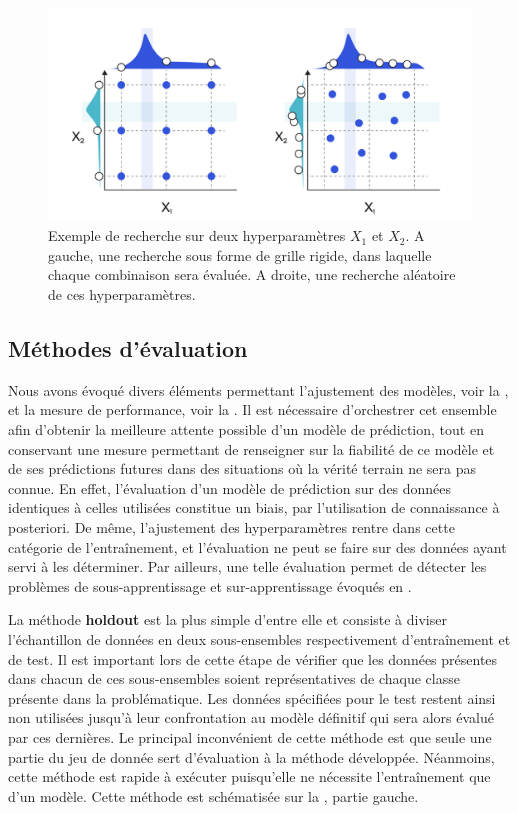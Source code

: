\begin{figure}[H]
    \centering
    \includegraphics[width=\linewidth]{contents/chapter_3/resources/example_hyperparameter_selection.pdf}
    \caption{Exemple de recherche sur deux hyperparamètres $X_1$ et $X_2$. A gauche, une recherche sous forme de grille rigide, dans laquelle chaque combinaison sera évaluée. A droite, une recherche aléatoire de ces hyperparamètres.}
    \label{fig:example_hyperparameter_selection}
\end{figure}

\subsection{Méthodes d'évaluation}
Nous avons évoqué divers éléments permettant l'ajustement des modèles, voir la , et la mesure de performance, voir la . Il est nécessaire d'orchestrer cet ensemble afin d'obtenir la meilleure attente possible d'un modèle de prédiction, tout en conservant une mesure permettant de renseigner sur la fiabilité de ce modèle et de ses prédictions futures dans des situations où la vérité terrain ne sera pas connue. En effet, l'évaluation d'un modèle de prédiction sur des données identiques à celles utilisées constitue un biais, par l'utilisation de connaissance à posteriori. De même, l'ajustement des hyperparamètres rentre dans cette catégorie de l'entraînement, et l'évaluation ne peut se faire sur des données ayant servi à les déterminer. Par ailleurs, une telle évaluation permet de détecter les problèmes de sous-apprentissage et sur-apprentissage évoqués en .\par

La méthode \textbf{holdout} est la plus simple d'entre elle et consiste à diviser l’échantillon de données en deux sous-ensembles respectivement d'entraînement et de test. Il est important lors de cette étape de vérifier que les données présentes dans chacun de ces sous-ensembles soient représentatives de chaque classe présente dans la problématique. Les données spécifiées pour le test restent ainsi non utilisées jusqu'à leur confrontation au modèle définitif qui sera alors évalué par ces dernières. Le principal inconvénient de cette méthode est que seule une partie du jeu de donnée sert d'évaluation à la méthode développée. Néanmoins, cette méthode est rapide à exécuter puisqu'elle ne nécessite l'entraînement que d'un modèle. Cette méthode est schématisée sur la \label{fig:scheme_holdout_cv}, partie gauche.\par

